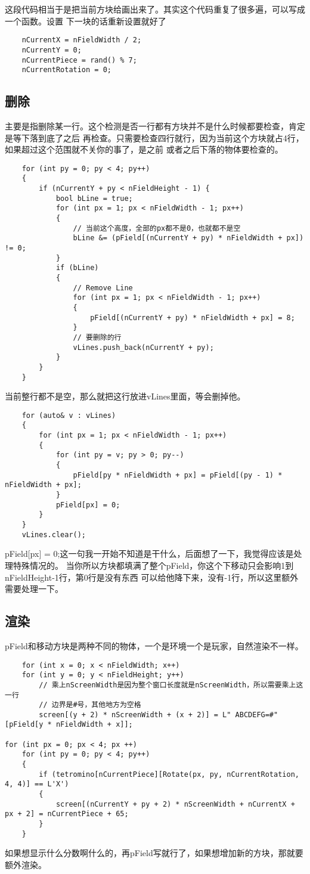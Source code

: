\documentclass{article}
\begin{document}
\begin{sloppypar}
这段代码相当于是把当前方块给画出来了。其实这个代码重复了很多遍，可以写成一个函数。设置
下一块的话重新设置就好了
\begin{lstlisting}
	nCurrentX = nFieldWidth / 2;
	nCurrentY = 0;
	nCurrentPiece = rand() % 7;
	nCurrentRotation = 0;
\end{lstlisting}

\subsection{删除}
主要是指删除某一行。这个检测是否一行都有方块并不是什么时候都要检查，肯定是等下落到底了之后
再检查。只需要检查四行就行，因为当前这个方块就占4行，如果超过这个范围就不关你的事了，是之前
或者之后下落的物体要检查的。
\begin{lstlisting}
	for (int py = 0; py < 4; py++)
	{
		if (nCurrentY + py < nFieldHeight - 1) {
			bool bLine = true;
			for (int px = 1; px < nFieldWidth - 1; px++)
			{   
				// 当前这个高度，全部的px都不是0，也就都不是空
				bLine &= (pField[(nCurrentY + py) * nFieldWidth + px]) != 0;
			}
			if (bLine)
			{
				// Remove Line
				for (int px = 1; px < nFieldWidth - 1; px++)
				{
					pField[(nCurrentY + py) * nFieldWidth + px] = 8;
				}
				// 要删除的行
				vLines.push_back(nCurrentY + py);
			}
		}
	}
\end{lstlisting}
当前整行都不是空，那么就把这行放进vLines里面，等会删掉他。
\begin{lstlisting}
	for (auto& v : vLines)
	{
		for (int px = 1; px < nFieldWidth - 1; px++)
		{
			for (int py = v; py > 0; py--)
			{
				pField[py * nFieldWidth + px] = pField[(py - 1) * nFieldWidth + px];
			}
			pField[px] = 0;
		}
	}
	vLines.clear();
\end{lstlisting}
pField[px] = 0;这一句我一开始不知道是干什么，后面想了一下，我觉得应该是处理特殊情况的。
当你所以方块都填满了整个pField，你这个下移动只会影响1到nFieldHeight-1行，第0行是没有东西
可以给他降下来，没有-1行，所以这里额外需要处理一下。

\subsection{渲染}
pField和移动方块是两种不同的物体，一个是环境一个是玩家，自然渲染不一样。
\begin{lstlisting}
	for (int x = 0; x < nFieldWidth; x++)
	for (int y = 0; y < nFieldHeight; y++)
		// 乘上nScreenWidth是因为整个窗口长度就是nScreenWidth，所以需要乘上这一行
		// 边界是#号，其他地方为空格
		screen[(y + 2) * nScreenWidth + (x + 2)] = L" ABCDEFG=#"[pField[y * nFieldWidth + x]];

for (int px = 0; px < 4; px ++)
	for (int py = 0; py < 4; py++)
	{
		if (tetromino[nCurrentPiece][Rotate(px, py, nCurrentRotation, 4, 4)] == L'X')
		{
			screen[(nCurrentY + py + 2) * nScreenWidth + nCurrentX + px + 2] = nCurrentPiece + 65;
		}
	}

\end{lstlisting}
如果想显示什么分数啊什么的，再pField写就行了，如果想增加新的方块，那就要额外渲染。

\printbibliography                               
\end{sloppypar}
\end{document}
